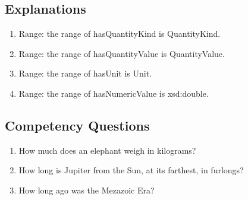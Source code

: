 \subsection{Explanations}
\label{exp:Quantities}
\begin{enumerate}
\item Range: the range of \textsf{hasQuantityKind} is \textsf{QuantityKind}.
\item Range: the range of \textsf{hasQuantityValue} is \textsf{QuantityValue}.
\item Range: the range of \textsf{hasUnit} is \textsf{Unit}.
\item Range: the range of \textsf{hasNumericValue} is \textsf{xsd:double}.
\end{enumerate}

\subsection{Competency Questions}
\label{cqs:Quantities}
\begin{enumerate}[CQ1.]
\item How much does an elephant weigh in kilograms?
\item How long is Jupiter from the Sun, at its farthest, in furlongs?
\item How long ago was the Mezazoic Era?
\end{enumerate}

\newpage
